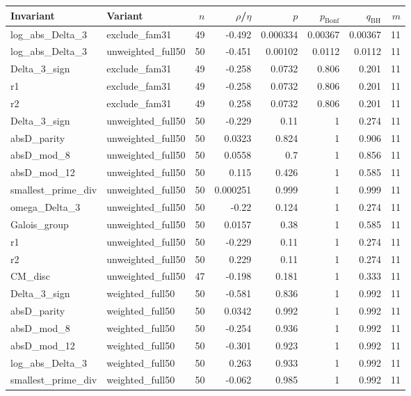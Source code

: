 \begin{tabular}{llrrrrrr}
\hline
Invariant & Variant & $n$ & $\rho$/$\eta$ & $p$ & $p_{\text{Bonf}}$ & $q_{\text{BH}}$ & $m$ \\
\hline
log\_abs\_Delta\_3 & exclude\_fam31 & 49 & -0.492 & 0.000334 & 0.00367 & 0.00367 & 11 \\
log\_abs\_Delta\_3 & unweighted\_full50 & 50 & -0.451 & 0.00102 & 0.0112 & 0.0112 & 11 \\
Delta\_3\_sign & exclude\_fam31 & 49 & -0.258 & 0.0732 & 0.806 & 0.201 & 11 \\
r1 & exclude\_fam31 & 49 & -0.258 & 0.0732 & 0.806 & 0.201 & 11 \\
r2 & exclude\_fam31 & 49 & 0.258 & 0.0732 & 0.806 & 0.201 & 11 \\
Delta\_3\_sign & unweighted\_full50 & 50 & -0.229 & 0.11 & 1 & 0.274 & 11 \\
absD\_parity & unweighted\_full50 & 50 & 0.0323 & 0.824 & 1 & 0.906 & 11 \\
absD\_mod\_8 & unweighted\_full50 & 50 & 0.0558 & 0.7 & 1 & 0.856 & 11 \\
absD\_mod\_12 & unweighted\_full50 & 50 & 0.115 & 0.426 & 1 & 0.585 & 11 \\
smallest\_prime\_div & unweighted\_full50 & 50 & 0.000251 & 0.999 & 1 & 0.999 & 11 \\
omega\_Delta\_3 & unweighted\_full50 & 50 & -0.22 & 0.124 & 1 & 0.274 & 11 \\
Galois\_group & unweighted\_full50 & 50 & 0.0157 & 0.38 & 1 & 0.585 & 11 \\
r1 & unweighted\_full50 & 50 & -0.229 & 0.11 & 1 & 0.274 & 11 \\
r2 & unweighted\_full50 & 50 & 0.229 & 0.11 & 1 & 0.274 & 11 \\
CM\_disc & unweighted\_full50 & 47 & -0.198 & 0.181 & 1 & 0.333 & 11 \\
Delta\_3\_sign & weighted\_full50 & 50 & -0.581 & 0.836 & 1 & 0.992 & 11 \\
absD\_parity & weighted\_full50 & 50 & 0.0342 & 0.992 & 1 & 0.992 & 11 \\
absD\_mod\_8 & weighted\_full50 & 50 & -0.254 & 0.936 & 1 & 0.992 & 11 \\
absD\_mod\_12 & weighted\_full50 & 50 & -0.301 & 0.923 & 1 & 0.992 & 11 \\
log\_abs\_Delta\_3 & weighted\_full50 & 50 & 0.263 & 0.933 & 1 & 0.992 & 11 \\
smallest\_prime\_div & weighted\_full50 & 50 & -0.062 & 0.985 & 1 & 0.992 & 11 \\

\end{tabular}
